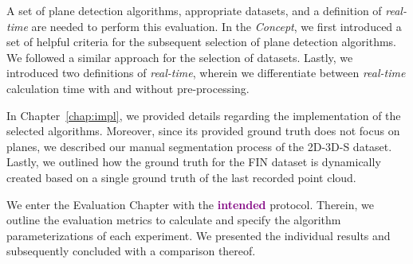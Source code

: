 \documentclass[main.tex]{subfiles}
\begin{document}
A set of plane detection algorithms, appropriate datasets, and a definition of \textit{real-time} are needed to perform this evaluation. In the \textit{Concept}, we first introduced a set of helpful criteria for the subsequent selection of plane detection algorithms. We followed a similar approach for the selection of datasets. Lastly, we introduced two definitions of \textit{real-time}, wherein we differentiate between \textit{real-time} calculation time with and without pre-processing.

In Chapter~\ref{chap:impl}, we provided details regarding the implementation of the selected algorithms. Moreover, since its provided ground truth does not focus on planes, we described our manual segmentation process of the 2D-3D-S dataset. Lastly, we outlined how the ground truth for the FIN dataset is dynamically created based on a single ground truth of the last recorded point cloud.

We enter the Evaluation Chapter with the \textbf{\textcolor{purple}{intended}} protocol. Therein, we outline the evaluation metrics to calculate and specify the algorithm parameterizations of each experiment. We presented the individual results and subsequently concluded with a comparison thereof. 
\end{document}

